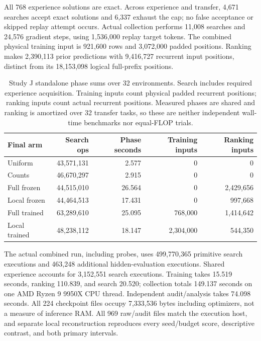 \documentclass[11pt]{article}
\begin{document}
All 768 experience solutions are exact. Across experience and transfer,
4,671 searches accept exact solutions and 6,337 exhaust the cap; no false
acceptance or skipped replay attempt occurs. Actual collection performs
11,008 searches and 24,576 gradient steps, using 1,536,000 replay target tokens.
The combined physical training input is 921,600 rows and 3,072,000 padded
positions. Ranking makes 2,390,113 prior predictions with 9,416,727 recurrent
input positions, distinct from its 18,153,098 logical full-prefix positions.

\begin{table}[ht]
\centering\small
\begin{tabular}{lrrrr}
\toprule
Final arm & Search ops & Phase seconds & Training inputs & Ranking inputs \\
\midrule
Uniform & 43,571,131 & 2.577 & 0 & 0 \\
Counts & 46,670,297 & 2.915 & 0 & 0 \\
Full frozen & 44,515,010 & 26.564 & 0 & 2,429,656 \\
Local frozen & 44,464,513 & 17.431 & 0 & 997,668 \\
Full trained & 63,289,610 & 25.095 & 768,000 & 1,414,642 \\
Local trained & 48,238,112 & 18.147 & 2,304,000 & 544,350 \\
\bottomrule
\end{tabular}
\caption{Study J standalone phase sums over 32 environments. Search includes
required experience acquisition. Training inputs count physical padded
recurrent positions; ranking inputs count actual recurrent positions.
Measured phases are shared and ranking is amortized over 32 transfer tasks,
so these are neither independent wall-time benchmarks nor equal-FLOP trials.}
\label{tab:j-costs}
\end{table}

The actual combined run, including probes, uses 499,770,365 primitive search
executions and 463,248 additional hidden-evaluation executions. Shared
experience accounts for 3,152,551 search executions. Training takes 15.519
seconds, ranking 110.839, and search 20.520; collection totals 149.137 seconds
on one AMD Ryzen 9 9950X CPU thread. Independent audit/analysis takes 74.098
seconds. All 224 checkpoint files occupy 7,333,536 bytes including optimizers,
not a measure of inference RAM. All 969 raw/audit files match the execution
host, and separate local reconstruction reproduces every seed/budget score,
descriptive contrast, and both primary intervals.
\end{document}

